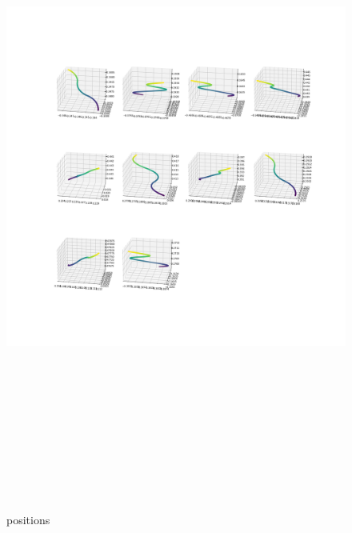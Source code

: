 \documentclass[12pt]{article}
\begin{document}
	\begin{figure}[H]
		\includegraphics[width=\linewidth, height=22cm]{subps3Bz.png} \caption{positions} \label{subps3Bz}
	\end{figure}
\end{document}
